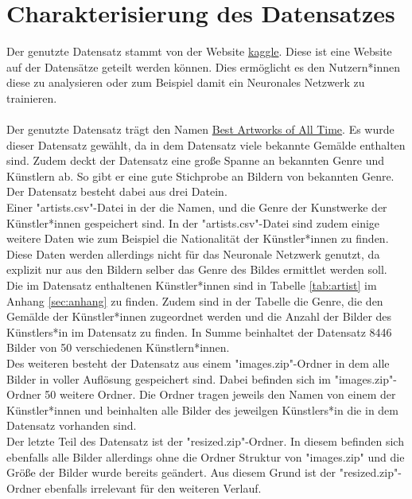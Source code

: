 \section{Charakterisierung des Datensatzes}
\label{sec:Charakterisierung}
Der genutzte Datensatz stammt von der Website \href{https://www.kaggle.com/}{kaggle}.
Diese ist eine Website auf der Datensätze geteilt werden können.
Dies ermöglicht es den Nutzern*innen diese zu analysieren oder zum Beispiel damit ein Neuronales Netzwerk zu trainieren.
\\\\
Der genutzte Datensatz trägt den Namen \href{https://www.kaggle.com/ikarus777/best-artworks-of-all-time}{Best Artworks of All Time}.
Es wurde dieser Datensatz gewählt, da in dem Datensatz viele bekannte Gemälde enthalten sind.
Zudem deckt der Datensatz eine große Spanne an bekannten Genre und Künstlern ab.
So gibt er eine gute Stichprobe an Bildern von bekannten Genre.
Der Datensatz besteht dabei aus drei Datein.
\\
Einer "artists.csv"-Datei in der die Namen, und die Genre der Kunstwerke der Künstler*innen gespeichert sind.
In der "artists.csv"-Datei sind zudem einige weitere Daten wie zum Beispiel die Nationalität der Künstler*innen zu finden.
Diese Daten werden allerdings nicht für das Neuronale Netzwerk genutzt, da explizit nur aus den Bildern selber das Genre des Bildes ermittlet werden soll.
Die im Datensatz enthaltenen Künstler*innen sind in Tabelle \ref{tab:artist} im Anhang \ref{sec:anhang} zu finden.
Zudem sind in der Tabelle die Genre, die den Gemälde der Künstler*innen zugeordnet werden und die Anzahl der Bilder des Künstlers*in im Datensatz zu finden.
In Summe beinhaltet der Datensatz 8446 Bilder von 50 verschiedenen Künstlern*innen.
\\
Des weiteren besteht der Datensatz aus einem "images.zip"-Ordner in dem alle Bilder in voller Auflösung gespeichert sind.
Dabei befinden sich im "images.zip"-Ordner 50 weitere Ordner.
Die Ordner tragen jeweils den Namen von einem der Künstler*innen und beinhalten alle Bilder des jeweilgen Künstlers*in die in dem Datensatz vorhanden sind.
\\
Der letzte Teil des Datensatz ist der "resized.zip"-Ordner.
In diesem befinden sich ebenfalls alle Bilder allerdings ohne die Ordner Struktur von "images.zip" und die Größe der Bilder wurde bereits geändert.
Aus diesem Grund ist der "resized.zip"-Ordner ebenfalls irrelevant für den weiteren Verlauf.
